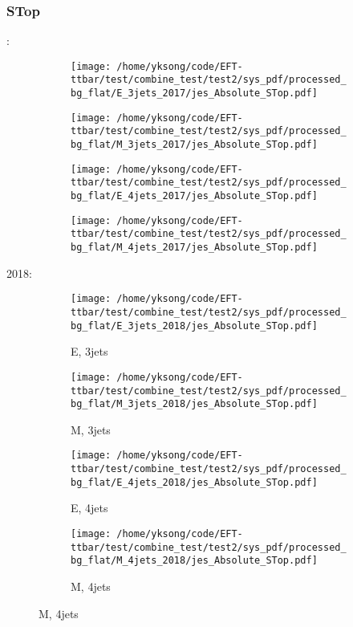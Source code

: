 \documentclass{beamer}
\begin{document}
\begin{frame}
\frametitle{STop}
\fontsize{5}{1}:
\begin{figure}
\centering
\begin{subfigure}[b]{0.24\textwidth}
\texttt{[image: /home/yksong/code/EFT-ttbar/test/combine\_test/test2/sys\_pdf/processed\_bg\_flat/E\_3jets\_2017/jes\_Absolute\_STop.pdf]}
\end{subfigure}
\begin{subfigure}[b]{0.24\textwidth}
\texttt{[image: /home/yksong/code/EFT-ttbar/test/combine\_test/test2/sys\_pdf/processed\_bg\_flat/M\_3jets\_2017/jes\_Absolute\_STop.pdf]}
\end{subfigure}
\begin{subfigure}[b]{0.24\textwidth}
\texttt{[image: /home/yksong/code/EFT-ttbar/test/combine\_test/test2/sys\_pdf/processed\_bg\_flat/E\_4jets\_2017/jes\_Absolute\_STop.pdf]}
\end{subfigure}
\begin{subfigure}[b]{0.24\textwidth}
\texttt{[image: /home/yksong/code/EFT-ttbar/test/combine\_test/test2/sys\_pdf/processed\_bg\_flat/M\_4jets\_2017/jes\_Absolute\_STop.pdf]}
\end{subfigure}
\end{figure}
2018:
\begin{figure}
\centering
\begin{subfigure}[b]{0.24\textwidth}
\texttt{[image: /home/yksong/code/EFT-ttbar/test/combine\_test/test2/sys\_pdf/processed\_bg\_flat/E\_3jets\_2018/jes\_Absolute\_STop.pdf]}
\captionsetup{font=tiny}
\caption{E, 3jets}
\end{subfigure}
\begin{subfigure}[b]{0.24\textwidth}
\texttt{[image: /home/yksong/code/EFT-ttbar/test/combine\_test/test2/sys\_pdf/processed\_bg\_flat/M\_3jets\_2018/jes\_Absolute\_STop.pdf]}
\captionsetup{font=tiny}
\caption{M, 3jets}
\end{subfigure}
\begin{subfigure}[b]{0.24\textwidth}
\texttt{[image: /home/yksong/code/EFT-ttbar/test/combine\_test/test2/sys\_pdf/processed\_bg\_flat/E\_4jets\_2018/jes\_Absolute\_STop.pdf]}
\captionsetup{font=tiny}
\caption{E, 4jets}
\end{subfigure}
\begin{subfigure}[b]{0.24\textwidth}
\texttt{[image: /home/yksong/code/EFT-ttbar/test/combine\_test/test2/sys\_pdf/processed\_bg\_flat/M\_4jets\_2018/jes\_Absolute\_STop.pdf]}
\captionsetup{font=tiny}
\caption{M, 4jets}
\end{subfigure}
\end{figure}
\end{frame}
\end{document}

